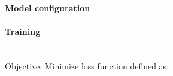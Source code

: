 \paragraph{Model configuration}

\paragraph{Training}\mbox{}\\
Objective: Minimize loss function defined as:


